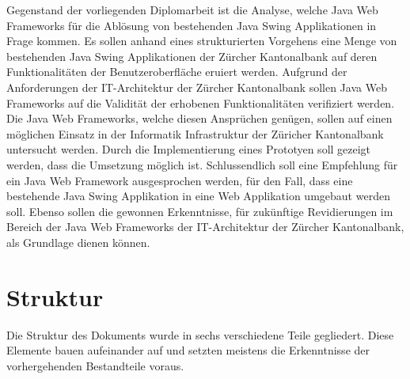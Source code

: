   Gegenstand der vorliegenden Diplomarbeit ist die Analyse, welche Java Web
  Frameworks für die Ablösung von bestehenden Java Swing Applikationen in Frage
  kommen. Es sollen anhand eines strukturierten Vorgehens eine Menge von
  bestehenden Java Swing Applikationen der Zürcher Kantonalbank auf deren
  Funktionalitäten der Benutzeroberfläche eruiert werden. Aufgrund der
  Anforderungen der IT-Architektur der Zürcher Kantonalbank sollen Java Web
  Frameworks auf die Validität der erhobenen Funktionalitäten verifiziert
  werden. Die Java Web Frameworks, welche diesen Ansprüchen genügen, sollen auf
  einen möglichen Einsatz in der Informatik Infrastruktur der Züricher
  Kantonalbank untersucht werden. Durch die Implementierung eines Prototyen
  soll gezeigt werden, dass die Umsetzung möglich ist. Schlussendlich soll eine
  Empfehlung für ein Java Web Framework ausgesprochen werden, für den Fall,
  dass eine bestehende Java Swing Applikation in eine Web Applikation umgebaut
  werden soll. Ebenso sollen die gewonnen Erkenntnisse, für zukünftige
  Revidierungen im Bereich der Java Web Frameworks der IT-Architektur der
  Zürcher Kantonalbank, als Grundlage dienen können.
  
  \section{Struktur}
  
  Die Struktur des Dokuments wurde in sechs verschiedene Teile gegliedert.
  Diese Elemente bauen aufeinander auf und setzten meistens die Erkenntnisse
  der vorhergehenden Bestandteile voraus.
  
